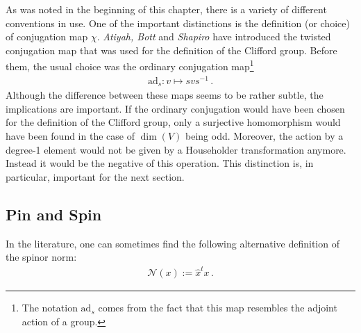     \begin{remark}
        As was noted in the beginning of this chapter, there is a variety of different conventions in use. One of the important distinctions is the definition (or choice) of conjugation map $\chi$. \textit{Atiyah, Bott} and \textit{Shapiro} have introduced the twisted conjugation map that was used for the definition of the Clifford group. Before them, the usual choice was the ordinary conjugation map\footnote{The notation $\mathrm{ad}_s$ comes from the fact that this map resembles the adjoint action of a group.}
        \begin{gather}
            \mathrm{ad}_s:v\mapsto svs^{-1}\,.
        \end{gather}
        Although the difference between these maps seems to be rather subtle, the implications are important. If the ordinary conjugation would have been chosen for the definition of the Clifford group, only a surjective homomorphism would have been found in the case of $\dim(V)$ being odd. Moreover, the action by a degree-1 element would not be given by a Householder transformation anymore. Instead it would be the negative of this operation. This distinction is, in particular, important for the next section.
    \end{remark}

\subsection{Pin and Spin}\label{section:spin}

    \begin{remark}
        In the literature, one can sometimes find the following alternative definition of the spinor norm:
        \begin{gather}
            \mathcal{N}(x) := \widehat{x}^tx\,.
        \end{gather}
    \end{remark}


